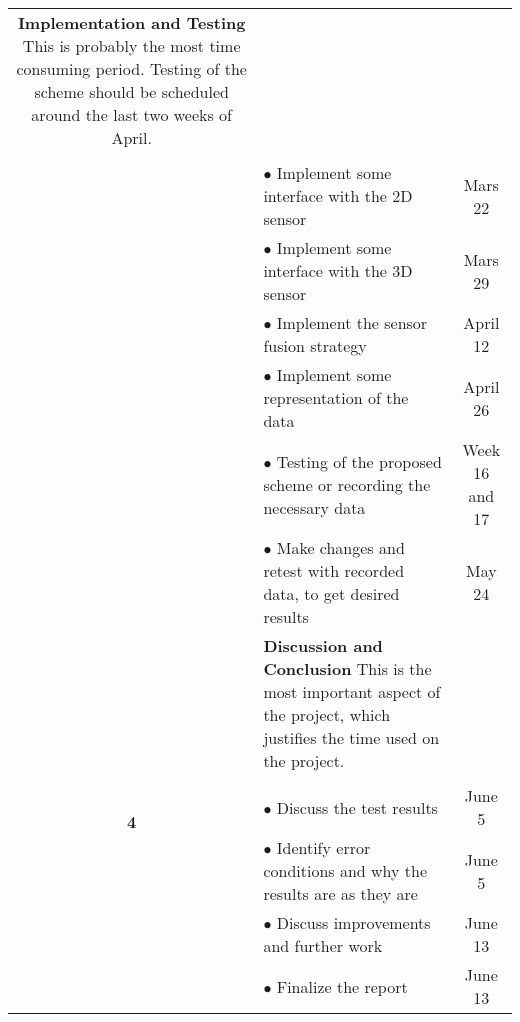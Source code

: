 \documentclass[a4paper, 10pt]{article}
\begin{document}
\begin{tabular}{| c | p{10.5cm} || c |}
                        \textbf{Implementation and Testing} This is probably the most
                        time consuming period. Testing of the scheme should be scheduled
                        around the last two weeks of April.  & \\
                        & & \\
                        & $\bullet$ Implement some interface with the 2D sensor & Mars 22  \\
                        & $\bullet$ Implement some interface with the 3D sensor & Mars 29 \\
                        & $\bullet$ Implement the sensor fusion strategy & April 12 \\
                        & $\bullet$ Implement some representation of the data & April 26 \\
                        & $\bullet$ Testing of the proposed scheme or recording the necessary data & Week 16 and 17 \\
                        & $\bullet$ Make changes and retest with recorded data, to get desired
                        results & May 24 \\
        \hline
        \multirow{6}{*}{\textbf{4}}  &   
                        \textbf{Discussion and Conclusion} This is the most important
                        aspect of the project, which justifies the time used on the
                        project. & \\
                        & &  \\
                        & $\bullet$ Discuss the test results & June 5 \\
                        & $\bullet$ Identify error conditions and why the results are as they are &
                                            June 5 \\
                        & $\bullet$ Discuss improvements and further work & June 13 \\
                        & $\bullet$ Finalize the report & June 13 \\
    \hline
\end{tabular}
\end{document}
